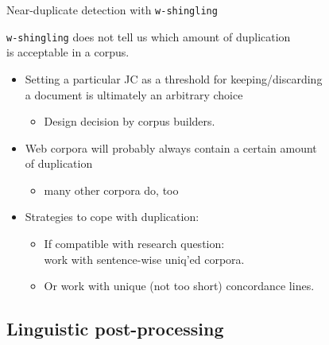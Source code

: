  \begin{frame}
{Near-duplicate detection with \texttt{w-shingling}}

\texttt{w-shingling} does not tell us which amount of duplication\\
is acceptable in a corpus.

\begin{itemize}
 \item<1-> Setting a particular JC as a threshold for keeping/discarding\\
   a document is ultimately an arbitrary choice
    \begin{itemize}
    \item Design decision by corpus builders. 
    \end{itemize}
\item<2-> Web corpora will probably always contain a certain amount\\
  of duplication
    \begin{itemize}
    \item many other corpora do, too
    \end{itemize}

\item<3-> Strategies to cope with duplication:
   \begin{itemize}
   \item If compatible with research question:\\
     work with sentence-wise uniq'ed corpora.
   \item Or work with unique (not too short) concordance lines.
   \end{itemize}


\end{itemize}
 
 \end{frame}


\subsection{Linguistic post-processing}


